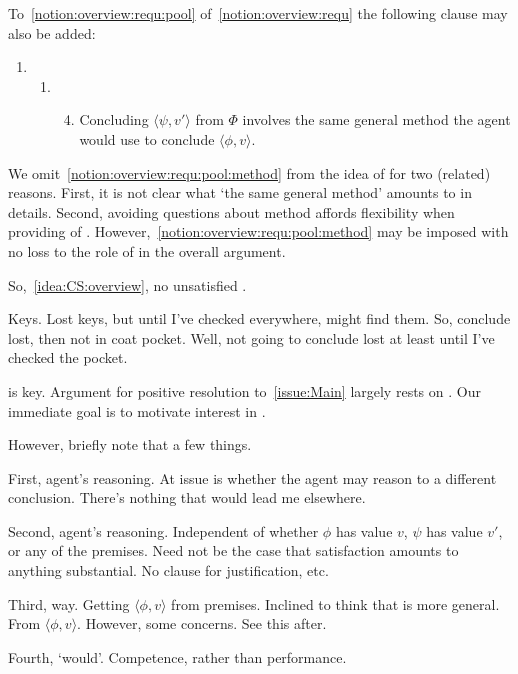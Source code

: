 \begin{note}
  To~\autoref{notion:overview:requ:pool} of~\autoref{notion:overview:requ} the following clause may also be added:
  \begin{enumerate}[label=]
  \item
    \begin{enumerate}[label=]
    \item
      \begin{enumerate}[label=\roman*., ref=(\roman*), resume*=csIdeaCounter]
        \setcounter{enumiii}{3}
      \item
        \label{notion:overview:requ:pool:method}
        Concluding \(\langle  \psi,v' \rangle\) from \(\Phi\) involves the same general method the agent would use to conclude \(\langle \phi,v \rangle\).
      \end{enumerate}
    \end{enumerate}
  \end{enumerate}
  We omit~\autoref{notion:overview:requ:pool:method} from the idea of \csN{} for two (related) reasons.
  First, it is not clear what `the same general method' amounts to in details.
  Second, avoiding questions about method affords flexibility when providing  of \csN{}.
  However,~\autoref{notion:overview:requ:pool:method} may be imposed with no loss to the role of \csN{} in the overall argument.
\end{note}

\begin{note}[\requ{3}]
  So,~\autoref{idea:CS:overview}, no unsatisfied .

  Keys.
  Lost keys, but until I've checked everywhere, might find them.
  So, conclude lost, then not in coat pocket.
  Well, not going to conclude lost at least until I've checked the pocket.
\end{note}

\begin{note}
  \csN{} is key.
  Argument for positive resolution to~\autoref{issue:Main} largely rests on \csN{}.
  Our immediate goal is to motivate interest in \csN{}.

  However, briefly note that a few things.

  First, agent's reasoning.
  At issue is whether the agent may reason to a different conclusion.
  There's nothing that would lead me elsewhere.

  Second, agent's reasoning.
  Independent of whether \(\phi\) has value \(v\), \(\psi\) has value \(v'\), or any of the premises.
  Need not be the case that satisfaction amounts to anything substantial.
  No clause for justification, etc.

  Third, way.
  Getting \(\langle \phi, v \rangle\) from premises.
  Inclined to think that \csN{} is more general.
  From \(\langle \phi, v \rangle\).
  However, some concerns.
  See this after.

  Fourth, `would'.
  Competence, rather than performance.
\end{note}

